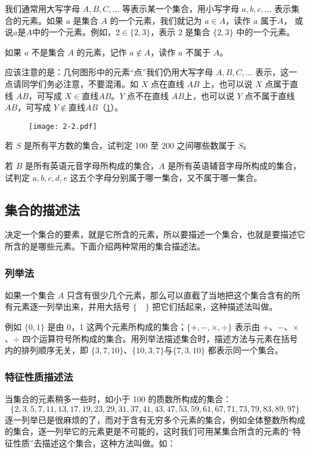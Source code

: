 我们通常用大写字母 $A,B,C,\ldots$ 等表示某一个集合，用小写字母 $a,b,c,\ldots$ 表示集合的元素。如果 $a$ 是集合 $A$ 的一个元素，我们就记为 $a\in A$，读作 $a$ 属于$A$， 或说$a$是$A$中的一个元素。例如，$2\in\{2,3\}$，表示 $2$ 是集合 $\{2,3\}$ 中的一个元素。

如果 $a$ 不是集合 $A$ 的元素，记作 $a\notin A$，读作 $a$ 不属于 $A$。

应该注意的是：几何图形中的元素“点”我们仍用大写字母 $A,B,C,\ldots$ 表示，这一点请同学们务必注意，不要混淆。如 $X$ 点在直线 $AB$ 上，也可以说 $X$ 点属于直线 $AB$，可写成 $X\in\text{直线}AB$。$Y$ 点不在直线 $AB$上，也可以说 $Y$ 点不属于直线 $AB$，可写成 $Y\notin\text{直线}AB$（\cref{fig:2-2}）。

\begin{figure}
	\texttt{[image: 2-2.pdf]}	
	\caption{}\label{fig:2-2}
\end{figure}

\begin{Practice}
\begin{question}
	\item 若 $S$ 是所有平方数的集合，试判定 100 至 200 之间哪些数属于 $S$。
	\item 若 $B$ 是所有英语元音字母所构成的集合，$A$ 是所有英语辅音字母所构成的集合，试判定 $a,b,c,d,e$ 这五个字母分别属于哪一集合，又不属于哪一集合。
\end{question}
\end{Practice}

\subsection{集合的描述法}
决定一个集合的要素，就是它所含的元素，所以要描述一个集合，也就是要描述它所含的是哪些元素。下面介绍两种常用的集合描述法。

\subsubsection{列举法}
如果一个集合 $A$ 只含有很少几个元素，那么可以直截了当地把这个集合含有的所有元素逐一列举出来，并用大括号 $\{\quad \}$ 把它们括起来，这种描述法叫做。

例如 $\{0,1\}$ 是由 0，1 这两个元素所构成的集合；$\{+,-,\times,\div\}$ 表示由 $+$、$-$、$\times$、$\div$ 四个运算符号所构成的集合。用列举法描述集合时，描述方法与元素在括号内的排列顺序无关，即 $\{3,7,10\}$、$\{10,3,7\}$与$\{7,3,10\}$ 都表示同一个集合。

\subsubsection{特征性质描述法}
当集合的元素稍多一些时，如小于 100 的质数所构成的集合：
\[\{2,3,5,7,11,13,17,19,23,29,31,37,41,43,47,53,59,61,67,71,73,79,83,89,97\}\]
逐一列举已是很麻烦的了，而对于含有无穷多个元素的集合，例如全体整数所构成的集合，逐一列举它的元素更是不可能的，这时我们可用某集合所含的元素的“特征性质”去描述这个集合，这种方法叫做。如：

